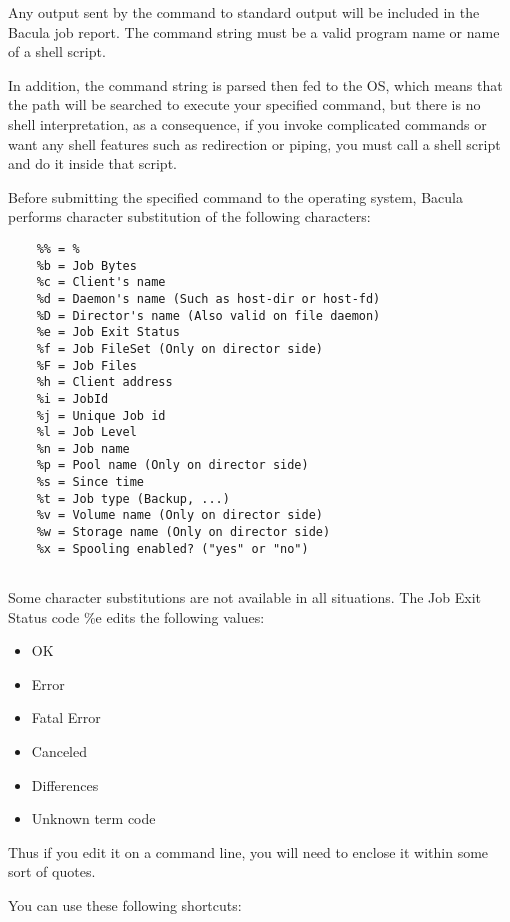 \begin{description}
   Any output sent by the command to standard output will be included in the
   Bacula job report.  The command string must be a valid program name or name
   of a shell script.

   In addition, the command string is parsed then fed to the OS,
   which means that the path will be searched to execute your specified
   command, but there is no shell interpretation, as a consequence, if you
   invoke complicated commands or want any shell features such as redirection
   or piping, you must call a shell script and do it inside that script.
 
   Before submitting the specified command to the operating system, Bacula
   performs character substitution of the following characters:

\label{character substitution}
\footnotesize
\begin{verbatim}
    %% = %
    %b = Job Bytes
    %c = Client's name
    %d = Daemon's name (Such as host-dir or host-fd)
    %D = Director's name (Also valid on file daemon)
    %e = Job Exit Status
    %f = Job FileSet (Only on director side)
    %F = Job Files
    %h = Client address
    %i = JobId
    %j = Unique Job id
    %l = Job Level
    %n = Job name
    %p = Pool name (Only on director side)
    %s = Since time
    %t = Job type (Backup, ...)
    %v = Volume name (Only on director side)
    %w = Storage name (Only on director side)
    %x = Spooling enabled? ("yes" or "no")
 
\end{verbatim}
\normalsize

Some character substitutions are not available in all situations. The Job Exit
Status code \%e edits the following values:

\begin{itemize}
\item OK
\item Error
\item Fatal Error
\item Canceled
\item Differences
\item Unknown term code
\end{itemize}

   Thus if you edit it on a command line, you will need to enclose 
   it within some sort of quotes.


You can use these following shortcuts:\\


\end{description}
